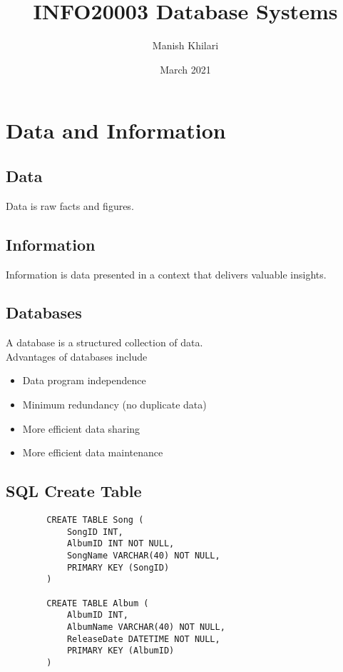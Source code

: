 \documentclass[12pt, a4paper]{article}
\title{INFO20003 Database Systems}
\author{Manish Khilari}
\date{March 2021}
\begin{document}
    
    \maketitle

    \section{Data and Information}
    \subsection{Data}
    Data is raw facts and figures. 

    \subsection{Information}
    Information is data presented in a context that delivers valuable insights. 

    \subsection{Databases}
    A database is a structured collection of data. \\
    Advantages of databases include 
    \begin{itemize}
        \item Data program independence 
        \item Minimum redundancy (no duplicate data) 
        \item More efficient data sharing 
        \item More efficient data maintenance 
    \end{itemize}

    \subsection{SQL Create Table}
    \begin{verbatim}
        CREATE TABLE Song (
            SongID INT, 
            AlbumID INT NOT NULL, 
            SongName VARCHAR(40) NOT NULL, 
            PRIMARY KEY (SongID)
        )

        CREATE TABLE Album (
            AlbumID INT, 
            AlbumName VARCHAR(40) NOT NULL, 
            ReleaseDate DATETIME NOT NULL, 
            PRIMARY KEY (AlbumID)
        )
    \end{verbatim}
\end{document}
